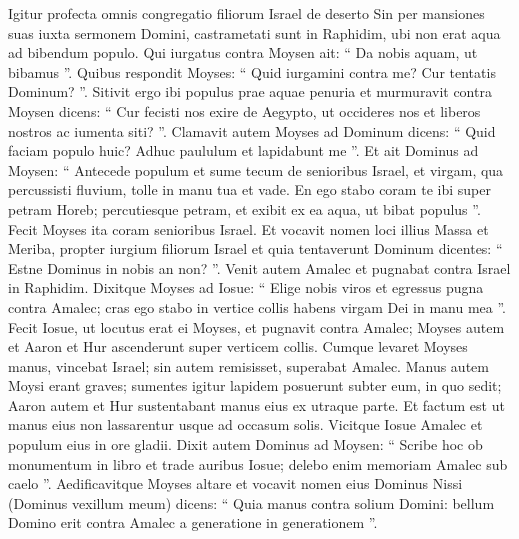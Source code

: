 \begin{biblechapter}
\begin{biblechapter}
\begin{biblechapter}
\begin{biblechapter}
\begin{biblechapter}
\begin{biblechapter}
\begin{biblechapter}
\begin{biblechapter}
\begin{biblechapter}
\begin{biblechapter}
\begin{biblechapter}
\begin{biblechapter}
\begin{biblechapter}
\begin{biblechapter}
\begin{biblechapter}
\begin{biblechapter}
\begin{biblechapter}
\verse Igitur profecta omnis congregatio filiorum Israel de deserto Sin per mansiones suas iuxta sermonem Domini, castrametati sunt in Raphidim, ubi non erat aqua ad bibendum populo. 
\verse Qui iurgatus contra Moysen ait: “ Da nobis aquam, ut bibamus ”. Quibus respondit Moyses: “ Quid iurgamini contra me? Cur tentatis Dominum? ”. 
\verse Sitivit ergo ibi populus prae aquae penuria et murmuravit contra Moysen dicens: “ Cur fecisti nos exire de Aegypto, ut occideres nos et liberos nostros ac iumenta siti? ”. 
\verse Clamavit autem Moyses ad Dominum dicens: “ Quid faciam populo huic? Adhuc paululum et lapidabunt me ”. 
 \verse Et ait Dominus ad Moysen: “ Antecede populum et sume tecum de senioribus Israel, et virgam, qua percussisti fluvium, tolle in manu tua et vade. 
\verse En ego stabo coram te ibi super petram Horeb; percutiesque petram, et exibit ex ea aqua, ut bibat populus ”. Fecit Moyses ita coram senioribus Israel. 
\verse Et vocavit nomen loci illius Massa et Meriba, propter iurgium filiorum Israel et quia tentaverunt Dominum dicentes: “ Estne Dominus in nobis an non? ”.
 \verse Venit autem Amalec et pugnabat contra Israel in Raphidim. 
\verse Dixitque Moyses ad Iosue: “ Elige nobis viros et egressus pugna contra Amalec; cras ego stabo in vertice collis habens virgam Dei in manu mea ”. 
\verse Fecit Iosue, ut locutus erat ei Moyses, et pugnavit contra Amalec; Moyses autem et Aaron et Hur ascenderunt super verticem collis. 
\verse Cumque levaret Moyses manus, vincebat Israel; sin autem remisisset, superabat Amalec. 
\verse Manus autem Moysi erant graves; sumentes igitur lapidem posuerunt subter eum, in quo sedit; Aaron autem et Hur sustentabant manus eius ex utraque parte. Et factum est ut manus eius non lassarentur usque ad occasum solis. 
\verse Vicitque Iosue Amalec et populum eius in ore gladii. 
\verse Dixit autem Dominus ad Moysen: “ Scribe hoc ob monumentum in libro et trade auribus Iosue; delebo enim memoriam Amalec sub caelo ”. 
\verse Aedificavitque Moyses altare et vocavit nomen eius Dominus Nissi (Dominus vexillum meum) 
\verse dicens:
 “ Quia manus contra solium Domini:
 bellum Domino erit contra Amalec a generatione in generationem ”.
 

\end{biblechapter}
\end{biblechapter}
\end{biblechapter}
\end{biblechapter}
\end{biblechapter}
\end{biblechapter}
\end{biblechapter}
\end{biblechapter}
\end{biblechapter}
\end{biblechapter}
\end{biblechapter}
\end{biblechapter}
\end{biblechapter}
\end{biblechapter}
\end{biblechapter}
\end{biblechapter}
\end{biblechapter}
